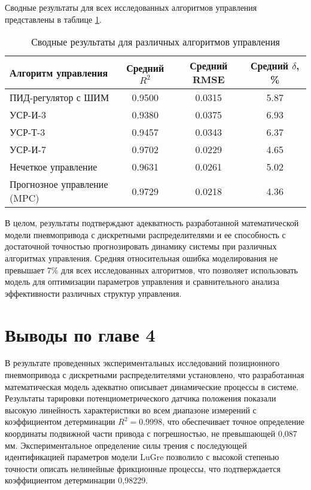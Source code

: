 Сводные результаты для всех исследованных алгоритмов управления представлены в таблице \ref{tab:validation_summary}.

\begin{table}[ht]
	\centering
	\caption{Сводные результаты для различных алгоритмов управления}
	\small
	\label{tab:validation_summary}
	\begin{tabular}{lccc}
		\hline
		\textbf{Алгоритм управления} & \textbf{Средний $R^2$} & \textbf{Средний RMSE} & \textbf{Средний $\delta$, \%} \\
		\hline
		ПИД-регулятор с ШИМ          & \num{0.9500}           & \num{0.0315}          & \num{5.87}                    \\
		УСР-И-3                      & \num{0.9380}           & \num{0.0375}          & \num{6.93}                    \\
		УСР-Т-3                      & \num{0.9457}           & \num{0.0343}          & \num{6.37}                    \\
		УСР-И-7                      & \num{0.9702}           & \num{0.0229}          & \num{4.65}                    \\
		Нечеткое управление          & \num{0.9631}           & \num{0.0261}          & \num{5.02}                    \\
		Прогнозное управление (MPC)  & \num{0.9729}           & \num{0.0218}          & \num{4.36}                    \\
		\hline
	\end{tabular}
\end{table}

В целом, результаты подтверждают адекватность
разработанной математической модели пневмопривода с дискретными распределителями и ее
способность с достаточной точностью прогнозировать динамику системы при
различных алгоритмах управления. Средняя относительная ошибка моделирования
не превышает 7\% для всех исследованных алгоритмов, что позволяет
использовать модель для оптимизации параметров управления
и сравнительного анализа эффективности различных структур управления.

\section{Выводы по главе 4}

В результате проведенных экспериментальных исследований позиционного пневмопривода с
дискретными распределителями установлено, что разработанная математическая модель адекватно описывает
динамические процессы в системе. Результаты тарировки потенциометрического датчика положения показали
высокую линейность характеристики во всем диапазоне измерений с коэффициентом детерминации $R^2 = \num{0,9998}$,
что обеспечивает точное определение координаты подвижной части привода с погрешностью, не превышающей 0,087 мм.
Экспериментальное определение силы трения с последующей идентификацией параметров модели LuGre позволило с высокой степенью
точности описать нелинейные фрикционные процессы, что подтверждается коэффициентом детерминации 0,98229.

